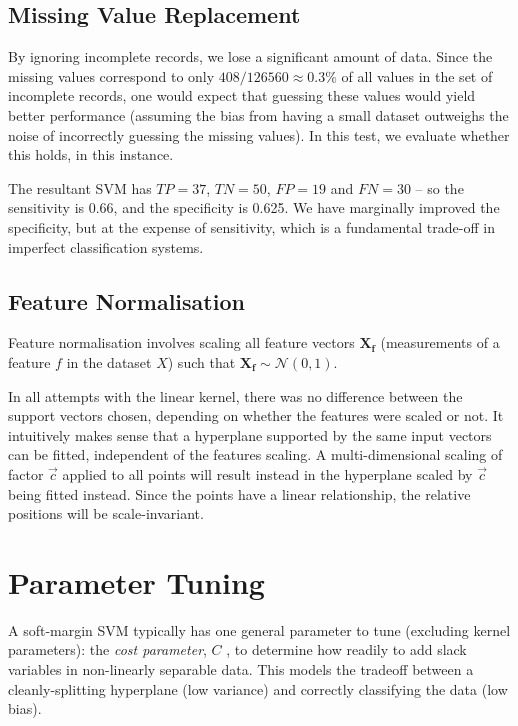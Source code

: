 \documentclass[paper=a4, fontsize=11pt]{scrartcl}
\numberwithin{equation}{section}
\numberwithin{figure}{section}
\numberwithin{table}{section}
\begin{document}
\subsection{Missing Value Replacement}

By ignoring incomplete records, we lose a significant amount of data. Since the
missing values correspond to only $408/126560 \approx 0.3 \%$ of all values in
the set of incomplete records, one would expect that guessing these values
would yield better performance (assuming the bias from having a small dataset
outweighs the noise of incorrectly guessing the missing values). In this test,
we evaluate whether this holds, in this instance.

The resultant SVM has $TP=37$, $TN=50$, $FP=19$ and $FN=30$ -- so the
sensitivity is 0.66, and the specificity is 0.625. We have marginally improved
the specificity, but at the expense of sensitivity, which is a fundamental
trade-off in imperfect classification systems.

\subsection{Feature Normalisation}

Feature normalisation involves scaling all feature vectors $\mathbf{X_f}$
(measurements of a feature $f$ in the dataset $X$) such that
\hbox{$\mathbf{X_f} \sim \mathcal{N}(0,1)$}. 

In all attempts with the linear kernel, there was no difference between the
support vectors chosen, depending on whether the features were scaled or not.
It intuitively makes sense that a hyperplane supported by the same input
vectors can be fitted, independent of the features scaling. A multi-dimensional
scaling of factor $\vec{c}$ applied to all points will result instead in the
hyperplane scaled by $\vec{c}$ being fitted instead. Since the points have a
linear relationship, the relative positions will be scale-invariant.

\section{Parameter Tuning}

A soft-margin SVM typically has one general parameter to tune (excluding kernel
parameters): the \emph{cost parameter}, $C$ , to determine how readily to add
slack variables in non-linearly separable data. This models the tradeoff
between a cleanly-splitting hyperplane (low variance) and correctly classifying
the data (low bias). 
\end{document}
